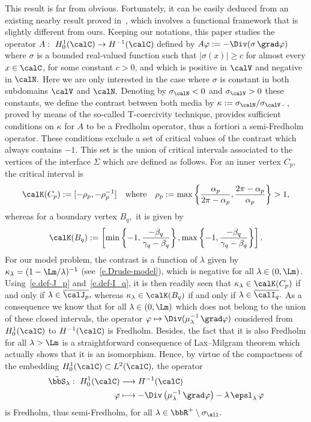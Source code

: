 This result is far from obvious. Fortunately, it can be easily deduced from an existing nearby result proved in~\cite{Bon-Che-Cia-12}, which involves a functional framework that is slightly different from ours. Keeping our notations, this paper studies the operator $A:\ H_0^1(\calC) \to H^{-1}(\calC)$ defined by $A\varphi := -\Div (\sigma\, \grad\varphi)$ where $\sigma$ is a bounded real-valued function such that $|\sigma(x)| \ge c$ for almost every $x \in \calC$, for some constant $c > 0$, and which is positive in $\calV$ and negative in $\calN.$ Here we are only interested in the case where $\sigma$ is constant in both subdomains $\calV$ and $\calN.$ Denoting by $\sigma_\calN < 0$ and $\sigma_\calV > 0$ these constants, we define the contrast between both media by $\kappa := \sigma_\calN/\sigma_\calV$. \cite[Theorem~4.3]{Bon-Che-Cia-12}, proved by means of the so-called T-coercivity technique, provides sufficient conditions on $\kappa$ for $A$ to be a Fredholm operator, thus a fortiori a semi-Fredholm operator. These conditions exclude a set of critical values of the contrast which always contains $-1$. This set is the union of critical intervals associated to the vertices of the interface $\Sigma$ which are defined as follows. For an inner vertex $C_p,$ the critical interval is
\[
\calK(C_p) := [-\rho_p,-\rho_p^{-1}]
\quad\text{where}\quad
\rho_p := \max \left\{ \frac{\alpha_p}{2\pi-\alpha_p}, \frac{2\pi-\alpha_p}{\alpha_p} \right\} > 1,
\]
whereas for a boundary vertex $B_q,$ it is given by
\[
\calK(B_q) := \left[\min\left\{ -1, \frac{-\beta_q}{\gamma_q-\beta_q} \right\},
\max\left\{ -1, \frac{-\beta_q}{\gamma_q-\beta_q} \right\} \right].
\]
For our model problem, the contrast is a function of $\lambda$ given by $\kappa_\lambda = (1-\Lm/\lambda)^{-1}$ (see~\eqref{e.Drude-model}), which is negative for all $\lambda \in (0,\Lm)$. Using~\eqref{e.def-J_p} and~\eqref{e.def-I_q}, it is then readily seen that $\kappa_\lambda \in \calK(C_p)$ if and only if $\lambda \in \overline{\calJ_p},$ whereas $\kappa_\lambda \in \calK(B_q)$ if and only if $\lambda \in \overline{\calI_q}.$ As a consequence we know that for all $\lambda \in (0,\Lm)$ which does not belong to the union of these closed intervals, the operator $\varphi \mapsto \Div (\mu_\lambda^{-1}\, \grad\varphi)$ considered from $H_0^1(\calC)$ to $H^{-1}(\calC)$ is Fredholm. Besides, the fact that it is also Fredholm for all $\lambda > \Lm$ is a straightforward consequence of Lax--Milgram theorem which actually shows that it is an isomorphism. Hence, by virtue of the compactness of the embedding $H_0^1(\calC) \subset L^2(\calC),$ the operator
\begin{align*}
\tilde\bbS_\lambda:\ H_0^1(\calC) & \longrightarrow H^{-1}(\calC) \\
\varphi & \longmapsto - \Div \left(\mu_\lambda^{-1}\, \grad\varphi \right) - \lambda\,\epsl_\lambda\,\varphi
\end{align*}
is Fredholm, thus semi-Fredholm, for all $\lambda \in \bbR^{+}\setminus\sigma_{\all}.$

